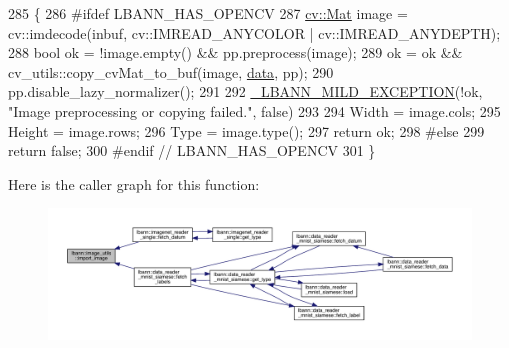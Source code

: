 \begin{DoxyCode}
285                                                                                                      \{
286 \textcolor{preprocessor}{#ifdef LBANN\_HAS\_OPENCV}
287   \hyperlink{base_8hpp_a68f11fdc31b62516cb310831bbe54d73}{cv::Mat} image = cv::imdecode(inbuf, cv::IMREAD\_ANYCOLOR | cv::IMREAD\_ANYDEPTH);
288   \textcolor{keywordtype}{bool} ok = !image.empty() && pp.preprocess(image);
289   ok = ok && cv\_utils::copy\_cvMat\_to\_buf(image, \hyperlink{namespacelbann_1_1cnpy__utils_a9ac86d96ccb1f8b4b2ea16441738781f}{data}, pp);
290   pp.disable\_lazy\_normalizer();
291 
292   \hyperlink{mild__exception_8hpp_a7b8339c566152ab29ce66b63e90c67f9}{\_LBANN\_MILD\_EXCEPTION}(!ok, \textcolor{stringliteral}{"Image preprocessing or copying failed."}, \textcolor{keyword}{false})
293 
294   Width  = image.cols;
295   Height = image.rows;
296   Type   = image.type();
297   return ok;
298 \textcolor{preprocessor}{#else}
299   \textcolor{keywordflow}{return} \textcolor{keyword}{false};
300 \textcolor{preprocessor}{#endif // LBANN\_HAS\_OPENCV}
301 \}
\end{DoxyCode}
Here is the caller graph for this function\+:\nopagebreak
\begin{figure}[H]
\begin{center}
\leavevmode
\includegraphics[width=350pt]{classlbann_1_1image__utils_a720f0987ec8eff333bf697ed18aafc93_icgraph}
\end{center}
\end{figure}
\mbox{\label{classlbann_1_1image__utils_af7c5409bd273f77282ecd9656e892cd3}} 

